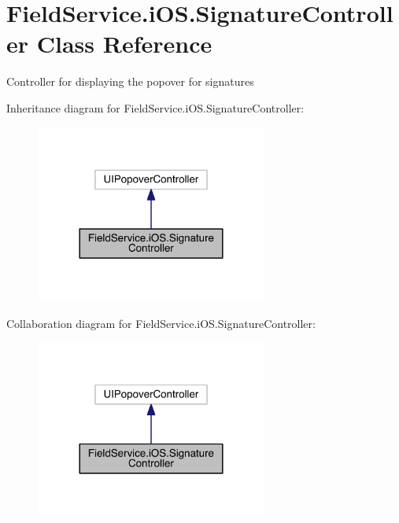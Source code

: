 \hypertarget{class_field_service_1_1i_o_s_1_1_signature_controller}{\section{Field\+Service.\+i\+O\+S.\+Signature\+Controller Class Reference}
\label{class_field_service_1_1i_o_s_1_1_signature_controller}
}


Controller for displaying the popover for signatures  




Inheritance diagram for Field\+Service.\+i\+O\+S.\+Signature\+Controller\+:
\nopagebreak
\begin{figure}[H]
\begin{center}
\leavevmode
\includegraphics[width=216pt]{class_field_service_1_1i_o_s_1_1_signature_controller__inherit__graph}
\end{center}
\end{figure}


Collaboration diagram for Field\+Service.\+i\+O\+S.\+Signature\+Controller\+:
\nopagebreak
\begin{figure}[H]
\begin{center}
\leavevmode
\includegraphics[width=216pt]{class_field_service_1_1i_o_s_1_1_signature_controller__coll__graph}
\end{center}
\end{figure}
